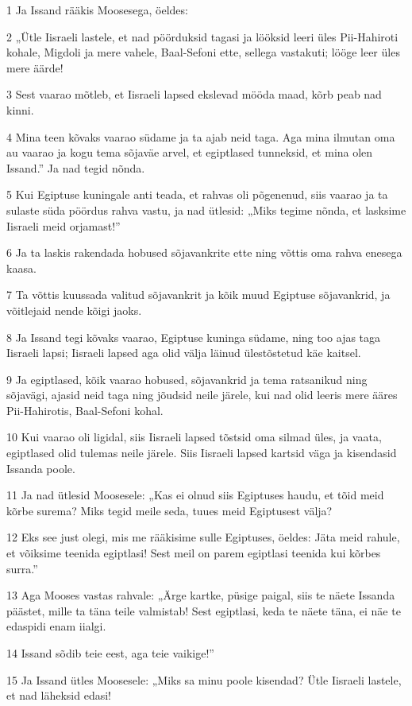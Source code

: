 \par 1 Ja Issand rääkis Moosesega, öeldes:
\par 2 „Ütle Iisraeli lastele, et nad pöörduksid tagasi ja lööksid leeri üles Pii-Hahiroti kohale, Migdoli ja mere vahele, Baal-Sefoni ette, sellega vastakuti; lööge leer üles mere äärde!
\par 3 Sest vaarao mõtleb, et Iisraeli lapsed ekslevad mööda maad, kõrb peab nad kinni.
\par 4 Mina teen kõvaks vaarao südame ja ta ajab neid taga. Aga mina ilmutan oma au vaarao ja kogu tema sõjaväe arvel, et egiptlased tunneksid, et mina olen Issand.” Ja nad tegid nõnda.
\par 5 Kui Egiptuse kuningale anti teada, et rahvas oli põgenenud, siis vaarao ja ta sulaste süda pöördus rahva vastu, ja nad ütlesid: „Miks tegime nõnda, et lasksime Iisraeli meid orjamast!”
\par 6 Ja ta laskis rakendada hobused sõjavankrite ette ning võttis oma rahva enesega kaasa.
\par 7 Ta võttis kuussada valitud sõjavankrit ja kõik muud Egiptuse sõjavankrid, ja võitlejaid nende kõigi jaoks.
\par 8 Ja Issand tegi kõvaks vaarao, Egiptuse kuninga südame, ning too ajas taga Iisraeli lapsi; Iisraeli lapsed aga olid välja läinud ülestõstetud käe kaitsel.
\par 9 Ja egiptlased, kõik vaarao hobused, sõjavankrid ja tema ratsanikud ning sõjavägi, ajasid neid taga ning jõudsid neile järele, kui nad olid leeris mere ääres Pii-Hahirotis, Baal-Sefoni kohal.
\par 10 Kui vaarao oli ligidal, siis Iisraeli lapsed tõstsid oma silmad üles, ja vaata, egiptlased olid tulemas neile järele. Siis Iisraeli lapsed kartsid väga ja kisendasid Issanda poole.
\par 11 Ja nad ütlesid Moosesele: „Kas ei olnud siis Egiptuses haudu, et tõid meid kõrbe surema? Miks tegid meile seda, tuues meid Egiptusest välja?
\par 12 Eks see just olegi, mis me rääkisime sulle Egiptuses, öeldes: Jäta meid rahule, et võiksime teenida egiptlasi! Sest meil on parem egiptlasi teenida kui kõrbes surra.”
\par 13 Aga Mooses vastas rahvale: „Ärge kartke, püsige paigal, siis te näete Issanda päästet, mille ta täna teile valmistab! Sest egiptlasi, keda te näete täna, ei näe te edaspidi enam iialgi.
\par 14 Issand sõdib teie eest, aga teie vaikige!”
\par 15 Ja Issand ütles Moosesele: „Miks sa minu poole kisendad? Ütle Iisraeli lastele, et nad läheksid edasi!
